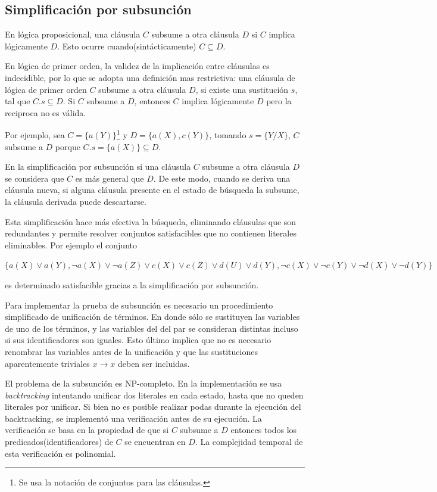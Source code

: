 \documentclass[a4paper,12pt]{article}
\begin{document}
\subsection{Simplificación por subsunción}
En lógica proposicional, una cláusula $C$ subsume a otra cláusula $D$ si $C$ implica lógicamente
$D$. Esto ocurre cuando(sintácticamente) $C\subseteq D$.

En lógica de primer orden, la validez de la implicación entre cláusulas es indecidible\cite{PracticalLogic},
por lo que se adopta una definición mas restrictiva: una cláusula de lógica de primer orden $C$ subsume a otra
cláusula $D$, si existe una sustitución $s$, tal que $C.s\subseteq D$. Si $C$ subsume a $D$, 
entonces $C$ implica lógicamente $D$ pero la reciproca no es válida.

Por ejemplo, sea $C=\{a(Y)\}$\footnote{Se usa la notación de conjuntos para las cláusulas.} y $D=\{a(X),c(Y)\}$, 
tomando $s=\{Y/X\}$, $C$ subsume a $D$ porque $C.s=\{a(X)\}\subseteq D$.

En la simplificación por subsunción si una cláusula $C$ subsume a otra cláusula $D$ se considera
que $C$ es más general que $D$. De este modo, cuando se deriva una cláusula nueva,
si alguna cláusula presente en el estado de búsqueda la subsume, la cláusula derivada
puede descartarse.

Esta simplificación hace más efectiva la búsqueda, eliminando cláusulas que son redundantes y
permite resolver conjuntos satisfacibles que no contienen literales eliminables. Por ejemplo el
conjunto
\begin{center}
$\{a(X) \lor  a(Y),\lnot a(X) \lor  \lnot a(Z) \lor  c(X) \lor  c(Z) \lor  d(U) \lor  d(Y),
\lnot c(X) \lor  \lnot c(Y) \lor  \lnot d(X) \lor  \lnot d(Y)\}$
\end{center}
es determinado satisfacible gracias a la simplificación por subsunción.

Para implementar la prueba de subsunción es necesario un procedimiento simplificado
de unificación de términos. En donde sólo se sustituyen las variables de uno de los términos,
y las variables del del par se consideran distintas incluso si sus identificadores son iguales.
Esto último implica que no es necesario renombrar las variables antes de la unificación y que las sustituciones
aparentemente triviales $x \rightarrow x$ deben ser incluidas.

El problema de la subsunción es NP-completo. En la implementación se usa \emph{backtracking}
intentando unificar dos literales en cada estado, hasta que no queden literales por unificar.
Si bien no es posible realizar podas durante la ejecución del backtracking, se implementó
una verificación antes de su ejecución.
La verificación se basa en la propiedad de que si $C$ subsume a $D$ entonces todos los predicados(identificadores)
de $C$ se encuentran en $D$. La complejidad temporal de esta verificación es polinomial.
\end{document}
